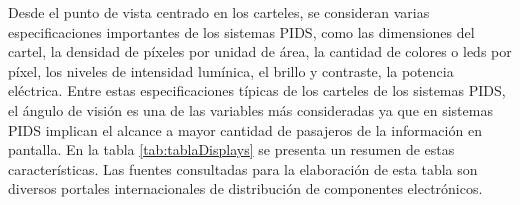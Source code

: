 
Desde el punto de vista centrado en los carteles, se consideran varias especificaciones importantes de los sistemas PIDS, como las dimensiones del cartel, la densidad de píxeles por unidad de área, la cantidad de colores o leds por píxel, los niveles de intensidad lumínica, el brillo y contraste, la potencia eléctrica. Entre estas especificaciones típicas de los carteles de los sistemas PIDS, el ángulo de visión es una de las variables más consideradas ya que en sistemas PIDS implican el alcance a mayor cantidad de pasajeros de la información en pantalla. En la tabla \ref{tab:tablaDisplays} se presenta un resumen de estas características. Las fuentes consultadas para la elaboración de esta tabla son diversos portales internacionales de distribución de componentes electrónicos.\\



